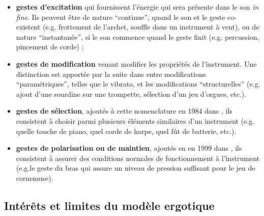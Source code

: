 	\begin{itemize}[noitemsep]
		\item \textbf{gestes d'excitation} qui fournissent l'énergie qui sera présente dans le son \textit{in fine}. Ils peuvent être de nature ``continue'', quand le son et le geste co-existent (e.g. frottement de l'archet, souffle dans un instrument à vent), ou de nature ``instantanée'', si le son commence quand le geste finit (e.g. percussion, pincement de corde) \cite{cadoz_gesture_2000};
		\item \textbf{gestes de modification} venant modifier les propriétés de l'instrument. Une distinction est apportée par la suite dans \cite{cadoz_synthese_1983} entre modifications ``paramétriques'', telles que le vibrato, et les modifications ``structurelles'' (e.g. ajout d'une sourdine sur une trompette, sélection d'un jeu d'orgues, etc.).
		\item \textbf{gestes de sélection}, ajoutés à cette nomenclature en 1984 dans \cite{luciani_modelisation_1984}, ils consistent à choisir parmi plusieurs éléments similaires d'un instrument (e.g. quelle touche de piano, quel corde de harpe, quel fût de batterie, etc.).
		\item \textbf{gestes de polarisation ou de maintien}, ajoutés en en 1999 dans \cite{cadoz_gesture_2000}, ils consistent à assurer des conditions normales de fonctionnement à l'instrument (e.g.le geste du bras qui assure un niveau de pression suffisant pour le jeu de cornemuse).
\end{itemize}

\subsection{Intérêts et limites du modèle ergotique}

